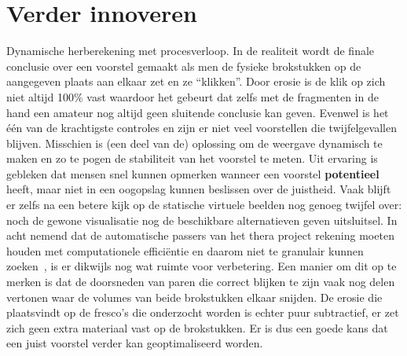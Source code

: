 \section{Verder innoveren}
Dynamische herberekening met procesverloop. In de realiteit wordt de finale conclusie over een voorstel gemaakt als men de fysieke brokstukken op de aangegeven plaats aan elkaar zet en ze ``klikken''. Door erosie is de klik op zich niet altijd 100\% vast waardoor het gebeurt dat zelfs met de fragmenten in de hand een amateur nog altijd geen sluitende conclusie kan geven. Evenwel is het \'e\'en van de krachtigste controles en zijn er niet veel voorstellen die twijfelgevallen blijven. Misschien is (een deel van de) oplossing om de weergave dynamisch te maken en zo te pogen de stabiliteit van het voorstel te meten. Uit ervaring is gebleken dat mensen snel kunnen opmerken wanneer een voorstel \textbf{potentieel} heeft, maar niet in een oogopslag kunnen beslissen over de juistheid. Vaak blijft er zelfs na een betere kijk op de statische virtuele beelden nog genoeg twijfel over: noch de gewone visualisatie nog de beschikbare alternatieven geven uitsluitsel. In acht nemend dat de automatische passers van het thera project rekening moeten houden met computationele effici\"entie en daarom niet te granulair kunnen zoeken~\cite{Brown2008}, is er dikwijls nog wat ruimte voor verbetering. Een manier om dit op te merken is dat de doorsneden van paren die correct blijken te zijn vaak nog delen vertonen waar de volumes van beide brokstukken elkaar snijden. De erosie die plaatsvindt op de fresco's die onderzocht worden is echter puur subtractief, er zet zich geen extra materiaal vast op de brokstukken. Er is dus een goede kans dat een juist voorstel verder kan geoptimaliseerd worden.\\

